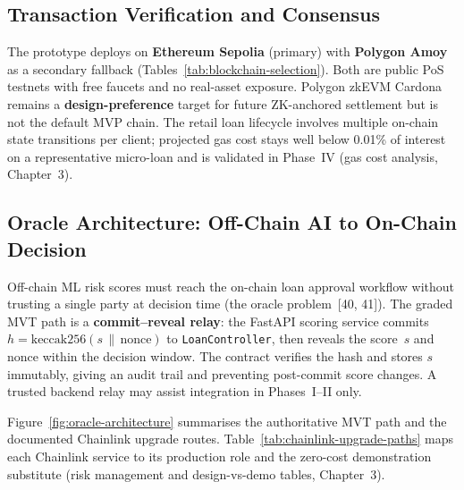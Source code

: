 \documentclass[12pt,a4paper]{article}
\begin{document}
\subsection{Transaction Verification and Consensus}

The prototype deploys on \textbf{Ethereum Sepolia} (primary) with \textbf{Polygon Amoy} as a secondary fallback (Tables~\ref{tab:blockchain-selection}). Both are public PoS testnets with free faucets and no real-asset exposure. Polygon zkEVM Cardona remains a \textbf{design-preference} target for future ZK-anchored settlement but is not the default MVP chain. The retail loan lifecycle involves multiple on-chain state transitions per client; projected gas cost stays well below 0.01\% of interest on a representative micro-loan and is validated in Phase~IV (gas cost analysis, Chapter~3).

\subsection{Oracle Architecture: Off-Chain AI to On-Chain Decision}
\label{sec:oracle-architecture}

Off-chain ML risk scores must reach the on-chain loan approval workflow without trusting a single party at decision time (the oracle problem~[40, 41]). The graded MVT path is a \textbf{commit--reveal relay}: the FastAPI scoring service commits $h = \text{keccak256}(s \,\|\, \text{nonce})$ to \texttt{LoanController}, then reveals the score~$s$ and nonce within the decision window. The contract verifies the hash and stores $s$ immutably, giving an audit trail and preventing post-commit score changes. A trusted backend relay may assist integration in Phases~I--II only.

Figure~\ref{fig:oracle-architecture} summarises the authoritative MVT path and the documented Chainlink upgrade routes. Table~\ref{tab:chainlink-upgrade-paths} maps each Chainlink service to its production role and the zero-cost demonstration substitute (risk management and design-vs-demo tables, Chapter~3).
\end{document}
